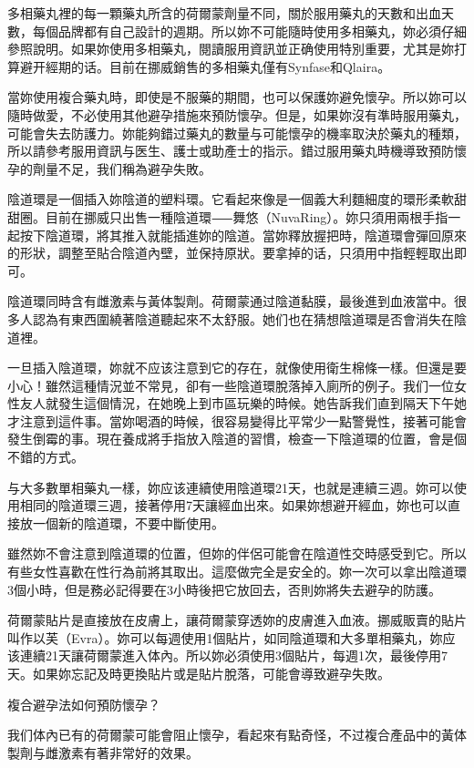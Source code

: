 \documentclass[12pt,UTF8]{ctexbook}
\begin{document}
多相藥丸裡的每一顆藥丸所含的荷爾蒙劑量不同，關於服用藥丸的天數和出血天數，每個品牌都有自己設計的週期。所以妳不可能隨時使用多相藥丸，妳必須仔細參照說明。如果妳使用多相藥丸，閱讀服用資訊並正确使用特別重要，尤其是妳打算避开經期的话。目前在挪威銷售的多相藥丸僅有Synfase和Qlaira。

當妳使用複合藥丸時，即使是不服藥的期間，也可以保護妳避免懷孕。所以妳可以隨時做愛，不必使用其他避孕措施來預防懷孕。但是，如果妳沒有準時服用藥丸，可能會失去防護力。妳能夠錯过藥丸的數量与可能懷孕的機率取決於藥丸的種類，所以請參考服用資訊与医生、護士或助產士的指示。錯过服用藥丸時機導致預防懷孕的劑量不足，我们稱為避孕失敗。

陰道環是一個插入妳陰道的塑料環。它看起來像是一個義大利麵細度的環形柔軟甜甜圈。目前在挪威只出售一種陰道環⸺舞悠（NuvaRing）。妳只須用兩根手指一起按下陰道環，將其推入就能插進妳的陰道。當妳釋放握把時，陰道環會彈回原來的形狀，調整至貼合陰道內壁，並保持原狀。要拿掉的话，只須用中指輕輕取出即可。

陰道環同時含有雌激素与黃体製劑。荷爾蒙通过陰道黏膜，最後進到血液當中。很多人認為有東西圍繞著陰道聽起來不太舒服。她们也在猜想陰道環是否會消失在陰道裡。

一旦插入陰道環，妳就不应该注意到它的存在，就像使用衛生棉條一樣。但還是要小心！雖然這種情況並不常見，卻有一些陰道環脫落掉入廁所的例子。我们一位女性友人就發生這個情況，在她晚上到市區玩樂的時候。她告訴我们直到隔天下午她才注意到這件事。當妳喝酒的時候，很容易變得比平常少一點警覺性，接著可能會發生倒霉的事。現在養成將手指放入陰道的習慣，檢查一下陰道環的位置，會是個不錯的方式。

与大多數單相藥丸一樣，妳应该連續使用陰道環21天，也就是連續三週。妳可以使用相同的陰道環三週，接著停用7天讓經血出來。如果妳想避开經血，妳也可以直接放一個新的陰道環，不要中斷使用。

雖然妳不會注意到陰道環的位置，但妳的伴侶可能會在陰道性交時感受到它。所以有些女性喜歡在性行為前將其取出。這麼做完全是安全的。妳一次可以拿出陰道環3個小時，但是務必記得要在3小時後把它放回去，否則妳將失去避孕的防護。

荷爾蒙貼片是直接放在皮膚上，讓荷爾蒙穿透妳的皮膚進入血液。挪威販賣的貼片叫作以芙（Evra）。妳可以每週使用1個貼片，如同陰道環和大多單相藥丸，妳应该連續21天讓荷爾蒙進入体內。所以妳必須使用3個貼片，每週1次，最後停用7天。如果妳忘記及時更換貼片或是貼片脫落，可能會導致避孕失敗。



複合避孕法如何預防懷孕？

我们体內已有的荷爾蒙可能會阻止懷孕，看起來有點奇怪，不过複合產品中的黃体製劑与雌激素有著非常好的效果。
\end{document}
